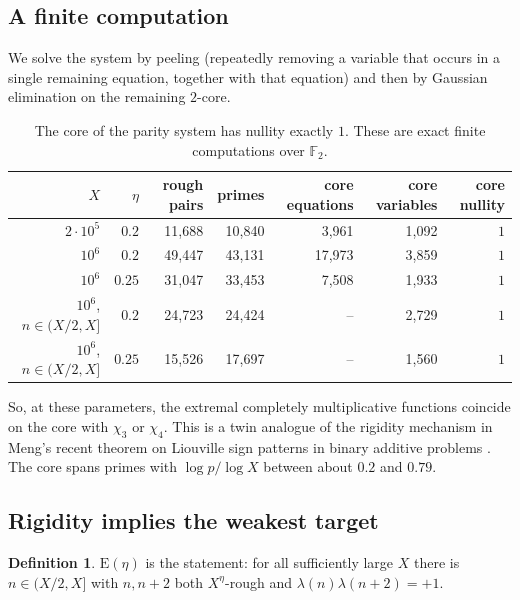 \documentclass[11pt]{amsart}
\theoremstyle{definition}
\newtheorem{definition}[theorem]{Definition}
\theoremstyle{remark}
\newcommand{\EE}{\mathrm E}
\begin{document}
\subsection{A finite computation}
We solve the system by peeling (repeatedly removing a variable that occurs in a single remaining equation, together with that equation) and then by Gaussian elimination on the remaining $2$-core.

\begin{table}[h]
\centering\small
\begin{tabular}{rrrrrrr}
\toprule
$X$ & $\eta$ & rough pairs & primes & core equations & core variables & core nullity\\
\midrule
$2\cdot10^5$ & $0.2$ & 11{,}688 & 10{,}840 & 3{,}961 & 1{,}092 & $1$\\
$10^6$ & $0.2$ & 49{,}447 & 43{,}131 & 17{,}973 & 3{,}859 & $1$\\
$10^6$ & $0.25$ & 31{,}047 & 33{,}453 & 7{,}508 & 1{,}933 & $1$\\
$10^6$, $n\in(X/2,X]$ & $0.2$ & 24{,}723 & 24{,}424 & -- & 2{,}729 & $1$\\
$10^6$, $n\in(X/2,X]$ & $0.25$ & 15{,}526 & 17{,}697 & -- & 1{,}560 & $1$\\
\bottomrule
\end{tabular}
\caption{The core of the parity system has nullity exactly $1$. These are exact finite computations over $\mathbb F_2$.}\label{tab:rank}
\end{table}

So, at these parameters, the extremal completely multiplicative functions coincide on the core with $\chi_3$ or $\chi_4$. This is a twin analogue of the rigidity mechanism in Meng's recent theorem on Liouville sign patterns in binary additive problems \cite{Men26}. The core spans primes with $\log p/\log X$ between about $0.2$ and $0.79$.

\subsection{Rigidity implies the weakest target}
\begin{definition}
$\EE(\eta)$ is the statement: for all sufficiently large $X$ there is $n\in(X/2,X]$ with $n,n+2$ both $X^\eta$-rough and $\lambda(n)\lambda(n+2)=+1$.
\end{definition}
\end{document}
